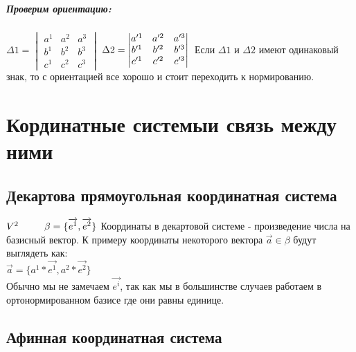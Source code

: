 \documentclass{book}
\begin{document}
\paragraph*{Проверим ориентацию:\\}
$\Delta1=\begin{vmatrix}
    a^1 & a^2 & a^3\\
    b^1 & b^2 & b^3\\
    c^1 & c^2 & c^3
\end{vmatrix}
$
$\Delta2=\begin{vmatrix}
    a'^1 & a'^2 & a'^3\\
    b'^1 & b'^2 & b'^3\\
    c'^1 & c'^2 & c'^3
\end{vmatrix}
\\$
Если $\Delta1$ и $\Delta2$ имеют одинаковый знак, то с ориентацией все хорошо и стоит переходить к нормированию.
\newpage
\chapter{Кординатные системы и связь между ними}
\section{Декартова прямоугольная координатная система}
$V^2\ \ \ \ \ \ \ \ \beta=\{\overrightarrow{e^1},\overrightarrow{e^2}\}\\$
Координаты в декартовой системе - произведение числа на базисный вектор. К примеру координаты некоторого вектора $\overrightarrow{a} \in \beta$ будут выглядеть как:\\
$\overrightarrow{a}=\{a^1*\overrightarrow{e^1},a^2*\overrightarrow{e^2}\}$\\
Обычно мы не замечаем $\overrightarrow{e^i}$, так как мы в большинстве случаев работаем в ортонормированном базисе где они равны единице.
\begin{figure}[h!]
\end{figure}
\section{Афинная координатная система}
\newpage
\end{document}
